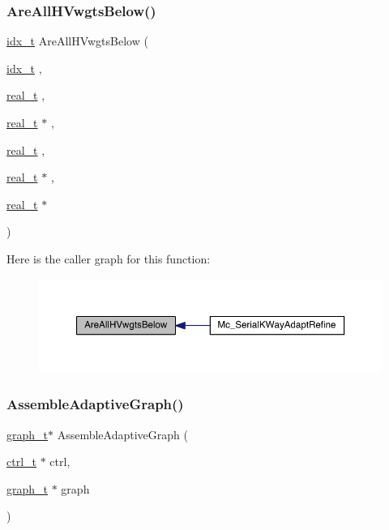 \subsubsection{\texorpdfstring{Are\+All\+H\+Vwgts\+Below()}{AreAllHVwgtsBelow()}}
{\footnotesize\ttfamily \hyperlink{a00876_aaa5262be3e700770163401acb0150f52}{idx\+\_\+t} Are\+All\+H\+Vwgts\+Below (\begin{DoxyParamCaption}\item[{\hyperlink{a00876_aaa5262be3e700770163401acb0150f52}{idx\+\_\+t}}]{,  }\item[{\hyperlink{a00876_a1924a4f6907cc3833213aba1f07fcbe9}{real\+\_\+t}}]{,  }\item[{\hyperlink{a00876_a1924a4f6907cc3833213aba1f07fcbe9}{real\+\_\+t} $\ast$}]{,  }\item[{\hyperlink{a00876_a1924a4f6907cc3833213aba1f07fcbe9}{real\+\_\+t}}]{,  }\item[{\hyperlink{a00876_a1924a4f6907cc3833213aba1f07fcbe9}{real\+\_\+t} $\ast$}]{,  }\item[{\hyperlink{a00876_a1924a4f6907cc3833213aba1f07fcbe9}{real\+\_\+t} $\ast$}]{ }\end{DoxyParamCaption})}

Here is the caller graph for this function\+:\nopagebreak
\begin{figure}[H]
\begin{center}
\leavevmode
\includegraphics[width=350pt]{a00951_a63cadc298b93f90fc2b8fbf9f4771f11_icgraph}
\end{center}
\end{figure}
\mbox{\label{a00951_a6ae8e881401699b2182da3976fb68298}} 
\subsubsection{\texorpdfstring{Assemble\+Adaptive\+Graph()}{AssembleAdaptiveGraph()}}
{\footnotesize\ttfamily \hyperlink{a00734}{graph\+\_\+t}$\ast$ Assemble\+Adaptive\+Graph (\begin{DoxyParamCaption}\item[{\hyperlink{a00742}{ctrl\+\_\+t} $\ast$}]{ctrl,  }\item[{\hyperlink{a00734}{graph\+\_\+t} $\ast$}]{graph }\end{DoxyParamCaption})}

